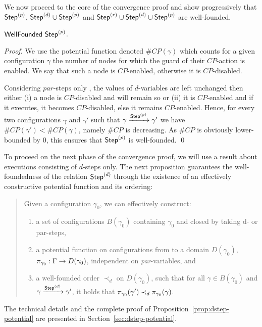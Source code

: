 We now proceed to the core of the convergence proof and show
progressively that $\mathsf{Step}^{(p)}$, $\mathsf{Step}^{(d)} \cup \mathsf{Step}^{(p)}$ and $\mathsf{Step}^{(r)} \cup
\mathsf{Step}^{(d)} \cup \mathsf{Step}^{(p)}$ are well-founded.

\begin{lemma}\label{lemma:p-steps:wf}
  $\mathsf{WellFounded}~ \mathsf{Step}^{(p)}$.
\end{lemma}
\begin{proof}
  We use the potential function denoted $\#CP(\gamma)$ which counts for a given
  configuration $\gamma$ the number of nodes for which the guard of
  their $CP$-action is enabled. We say that such a node is $CP$-enabled,
  otherwise it is $CP$-disabled.

  Considering $par$-steps only \ie, the values of $d$-variables are left
  unchanged then either (i) a node is $CP$-disabled and will remain so
  or (ii) it is $CP$-enabled and if it executes, it becomes $CP$-disabled,
  else it remains $CP$-enabled.  Hence, for every two configurations
  $\gamma$ and $\gamma'$ such that $\gamma \xrightarrow{\mathsf{Step}^{(p)}} \gamma'$
  we have $\#CP(\gamma') < \#CP(\gamma)$, namely $\#CP$ is
  decreasing. As $\#CP$ is obviously lower-bounded by 0, this ensures that
  $\mathsf{Step}^{(p)}$ is well-founded. \qed
\end{proof}

To proceed on the next phase of the convergence proof, we will use a
result about executions consisting of $d$-steps only.  The next
proposition guarantees the well-foundedness of the relation $\mathsf{Step}^{(d)}$
through the existence of an effectively constructive potential
function and its ordering:
\begin{quote}
  \begin{proposition}\label{prop:dstep-potential}
    Given a configuration $\gamma_0$, we can effectively construct:
    \begin{enumerate}[label=(\alph*)]
    \item a set of configurations $B(\gamma_0)$ containing $\gamma_0$
      and closed by taking d- or par-steps,
    \item a potential function on configurations from \Env to a
      domain $D(\gamma_0)$, $\pi_{\gamma_0} :
      \Gamma \rightarrow D(\gamma_0)$, independent on
      \textit{par}-variables, and
    \item a well-founded order $\prec_d$ on $D(\gamma_0)$,
      such that for all $\gamma \in
      B(\gamma_0)$ and $\gamma \xrightarrow{\mathsf{Step}^{(d)}} \gamma'$, it holds that
      $\pi_{\gamma_0}(\gamma') \prec_d \pi_{\gamma_0}(\gamma)$.
      \end{enumerate}
  \end{proposition}
\end{quote}
The technical details and the complete proof of
Proposition~\ref{prop:dstep-potential} are presented in
Section~\ref{sec:dstep-potential}.

